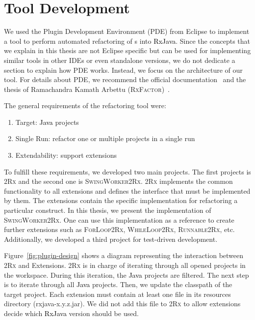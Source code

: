 \documentclass[type=bsc,accentcolor=tud9c]{tudthesis}
\newcommand{\framework}[1]{\textcolor{black}{#1}}
\newcommand{\toolcore}{\textsc{2Rx}}
\newcommand{\toolextension}{\textsc{SwingWorker2Rx}}
\begin{document}
\section{Tool Development}
We used the Plugin Development Environment (PDE) from Eclipse to implement a tool to perform automated refactoring of s into \framework{RxJava}. Since the concepts that we explain in this thesis are not Eclipse specific but can be used for implementing similar tools in other IDEs or even standalone versions, we do not dedicate a section to explain how PDE works. Instead, we focus on the architecture of our tool. For details about PDE, we recommend the official documentation~\cite{pdeEclipse} and the thesis of Ramachandra Kamath Arbettu (\textsc{RxFactor})~\cite{thesisRxFactor}.

The general requirements of the refactoring tool were:
\begin{enumerate}
	\item Target: \framework{Java} projects
	\item Single Run: refactor one or multiple projects in a single run
	\item Extendability: support extensions
\end{enumerate}

To fulfill these requirements, we developed two main projects. The first projects is \toolcore{} and the second one is \toolextension{}. \toolcore{} implements the common functionality to all extensions and defines the interface that must be implemented by them. The extensions contain the specific implementation for refactoring a particular construct. In this thesis, we present the implementation of \toolextension{}. One can use this implementation as a reference to create further extensions such as \textsc{ForLoop2Rx}, \textsc{WhileLoop2Rx}, \textsc{Runnable2Rx}, etc. Additionally, we developed a third project for test-driven development.

Figure~\ref{fig:plugin-design} shows a diagram representing the interaction between \toolcore{} and Extensions. \toolcore{} is in charge of iterating through all opened projects in the workspace. During this iteration, the \framework{Java} projects are filtered. The next step is to iterate through all \framework{Java} projects. Then, we update the classpath of the target project. Each extension must contain at least one  file in its resources directory (rxjava-x.y.z.jar). We did not add this  file to \toolcore{} to allow extensions decide which \framework{RxJava} version should be used.
\end{document}
